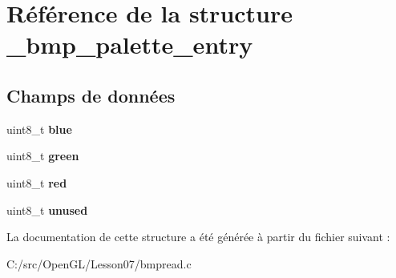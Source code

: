 \hypertarget{struct__bmp__palette__entry}{}\section{Référence de la structure \+\_\+bmp\+\_\+palette\+\_\+entry}
\label{struct__bmp__palette__entry}
\subsection*{Champs de données}
\begin{DoxyCompactItemize}
\item 
\hypertarget{struct__bmp__palette__entry_a287b397e90d7b995c81ff54e741f96b2}{}uint8\+\_\+t {\bfseries blue}\label{struct__bmp__palette__entry_a287b397e90d7b995c81ff54e741f96b2}

\item 
\hypertarget{struct__bmp__palette__entry_a90d21fa503b626c00cdc8d94863d5877}{}uint8\+\_\+t {\bfseries green}\label{struct__bmp__palette__entry_a90d21fa503b626c00cdc8d94863d5877}

\item 
\hypertarget{struct__bmp__palette__entry_ad47d918910aaa51c73160ac85999d09c}{}uint8\+\_\+t {\bfseries red}\label{struct__bmp__palette__entry_ad47d918910aaa51c73160ac85999d09c}

\item 
\hypertarget{struct__bmp__palette__entry_af3138032961911b5742b4344e37f43d4}{}uint8\+\_\+t {\bfseries unused}\label{struct__bmp__palette__entry_af3138032961911b5742b4344e37f43d4}

\end{DoxyCompactItemize}


La documentation de cette structure a été générée à partir du fichier suivant \+:\begin{DoxyCompactItemize}
\item 
C\+:/src/\+Open\+G\+L/\+Lesson07/bmpread.\+c\end{DoxyCompactItemize}
